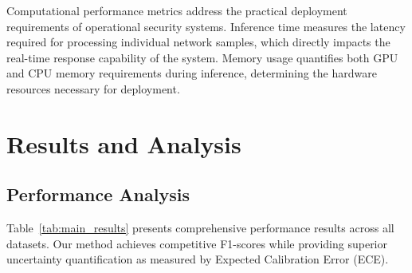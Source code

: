 \documentclass[journal]{IEEEtran}
\begin{document}
Computational performance metrics address the practical deployment requirements of operational security systems. Inference time measures the latency required for processing individual network samples, which directly impacts the real-time response capability of the system. Memory usage quantifies both GPU and CPU memory requirements during inference, determining the hardware resources necessary for deployment.

\section{Results and Analysis}

\subsection{Performance Analysis}

Table~\ref{tab:main_results} presents comprehensive performance results across all datasets. Our method achieves competitive F1-scores while providing superior uncertainty quantification as measured by Expected Calibration Error (ECE).
\end{document}
